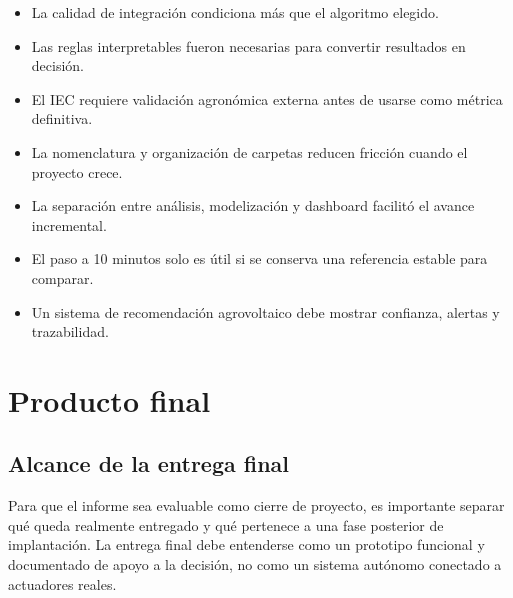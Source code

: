﻿\documentclass[11pt,a4paper]{article}
\begin{document}
\begin{itemize}
    \item La calidad de integración condiciona más que el algoritmo elegido.
    \item Las reglas interpretables fueron necesarias para convertir resultados en decisión.
    \item El IEC requiere validación agronómica externa antes de usarse como métrica definitiva.
    \item La nomenclatura y organización de carpetas reducen fricción cuando el proyecto crece.
    \item La separación entre análisis, modelización y dashboard facilitó el avance incremental.
    \item El paso a 10 minutos solo es útil si se conserva una referencia estable para comparar.
    \item Un sistema de recomendación agrovoltaico debe mostrar confianza, alertas y trazabilidad.
\end{itemize}
\newpage

\section{Producto final}

\subsection{Alcance de la entrega final}

Para que el informe sea evaluable como cierre de proyecto, es importante separar qué queda realmente entregado y qué pertenece a una fase posterior de implantación. La entrega final debe entenderse como un prototipo funcional y documentado de apoyo a la decisión, no como un sistema autónomo conectado a actuadores reales.
\end{document}
